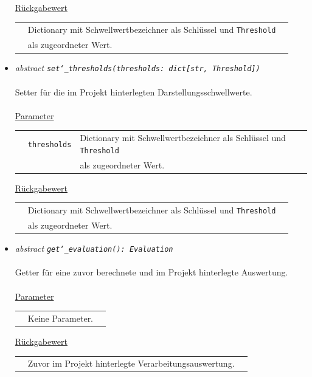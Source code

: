 \documentclass{article}
\begin{document}
\begin{itemize}
\underline{Rückgabewert}\\
\begin{tabular}{lll}
 & Dictionary mit Schwellwertbezeichner als Schlüssel und \texttt{Threshold}\\
 & als zugeordneter Wert.\\
\end{tabular}


\item \textit{\flqq{}abstract\frqq} \texttt{\textit{set\char`_thresholds(thresholds: dict[str, Threshold])}}\\\\
Setter für die im Projekt hinterlegten Darstellungsschwellwerte.
\\\\
\underline{Parameter}\\
\begin{tabular}{lll}
 & \texttt{thresholds} & Dictionary mit Schwellwertbezeichner als Schlüssel und \texttt{Threshold}\\
 && als zugeordneter Wert.\\
\end{tabular}

\underline{Rückgabewert}\\
\begin{tabular}{lll}
 & Dictionary mit Schwellwertbezeichner als Schlüssel und \texttt{Threshold}\\
 & als zugeordneter Wert.\\
\end{tabular}


\item \textit{\flqq{}abstract\frqq} \texttt{\textit{get\char`_evaluation(): Evaluation}}\\\\
Getter für eine zuvor berechnete und im Projekt hinterlegte Auswertung.
\\\\
\underline{Parameter}\\
\begin{tabular}{lll}
 & Keine Parameter.\\
\end{tabular}

\underline{Rückgabewert}\\
\begin{tabular}{lll}
 & Zuvor im Projekt hinterlegte Verarbeitungsauswertung.\\
\end{tabular}
\end{itemize}
\end{document}
